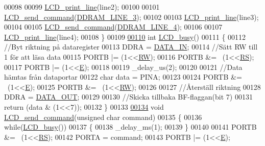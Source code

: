 \begin{DoxyCode}
{00098     
00099     \hyperlink{_l_c_d_8c_a0da229bb95e0c51e189ce10e20eb91c5}{LCD\_print\_line}(line2);
00100     
00101     \hyperlink{_l_c_d_8c_aa6d8c104e37eef62ba3a6046d1333ca6}{LCD\_send\_command}(\hyperlink{_l_c_d_8c_aee61787ba0a481741523399b51b969ce}{DDRAM\_LINE\_3});
00102     
00103     \hyperlink{_l_c_d_8c_a0da229bb95e0c51e189ce10e20eb91c5}{LCD\_print\_line}(line3);
00104     
00105     \hyperlink{_l_c_d_8c_aa6d8c104e37eef62ba3a6046d1333ca6}{LCD\_send\_command}(\hyperlink{_l_c_d_8c_ac4b6edb4691748f93245ae9eb802ea55}{DDRAM\_LINE\_4});
00106     
00107     \hyperlink{_l_c_d_8c_a0da229bb95e0c51e189ce10e20eb91c5}{LCD\_print\_line}(line4);
00108 \}
00109 
\hypertarget{_l_c_d_8c_source.tex_l00110}{}\hyperlink{_l_c_d_8h_a6679ea6f481524d1b6a30c4d99b8aad5}{00110} \textcolor{keywordtype}{int} \hyperlink{_l_c_d_8c_a6679ea6f481524d1b6a30c4d99b8aad5}{LCD\_busy}()
00111 \{
00112     \textcolor{comment}{//Byt riktning på dataregister}
00113     DDRA = \hyperlink{_l_c_d_8c_abebff40b775e10e37faa4ec7b45d6a89}{DATA\_IN};
00114     \textcolor{comment}{//Sätt RW till 1 för att läsa data}
00115     PORTB |= (1<<\hyperlink{_l_c_d_8c_afc4ded33ac0ca43defcce639e965748a}{RW});
00116     PORTB &= ~(1<<\hyperlink{_l_c_d_8c_af8903d8eea3868940c60af887473b152}{RS});
00117     PORTB |= (1<<\hyperlink{_l_c_d_8c_a07484107e6d9fdf38b53edf631d6511d}{E});
00118     
00119     \_delay\_us(2);
00120     
00121     \textcolor{comment}{//Data hämtas från dataportar}
00122     \textcolor{keywordtype}{char} data = PINA;
00123     
00124     PORTB &= ~(1<<\hyperlink{_l_c_d_8c_a07484107e6d9fdf38b53edf631d6511d}{E});
00125     PORTB &= ~(1<<\hyperlink{_l_c_d_8c_afc4ded33ac0ca43defcce639e965748a}{RW});
00126     
00127     \textcolor{comment}{//Återställ riktning}
00128     DDRA = \hyperlink{_l_c_d_8c_abfb497db759edfde127952c40722ddf3}{DATA\_OUT};
00129     
00130     \textcolor{comment}{//Skicka tillbaka BF-flaggan(bit 7)}
00131     \textcolor{keywordflow}{return} (data & (1<<7));
00132 \}
00133 
\hypertarget{_l_c_d_8c_source.tex_l00134}{}\hyperlink{_l_c_d_8h_aa6d8c104e37eef62ba3a6046d1333ca6}{00134} \textcolor{keywordtype}{void} \hyperlink{_l_c_d_8c_aa6d8c104e37eef62ba3a6046d1333ca6}{LCD\_send\_command}(\textcolor{keywordtype}{unsigned} \textcolor{keywordtype}{char} command)
00135 \{
00136     \textcolor{keywordflow}{while}(\hyperlink{_l_c_d_8c_a6679ea6f481524d1b6a30c4d99b8aad5}{LCD\_busy}())
00137     \{
00138         \_delay\_ms(1);
00139     \}
00140     
00141     PORTB &= ~(1<<\hyperlink{_l_c_d_8c_af8903d8eea3868940c60af887473b152}{RS});
00142     PORTA = command;
00143     PORTB |= (1<<\hyperlink{_l_c_d_8c_a07484107e6d9fdf38b53edf631d6511d}{E});
}
\end{DoxyCode}
